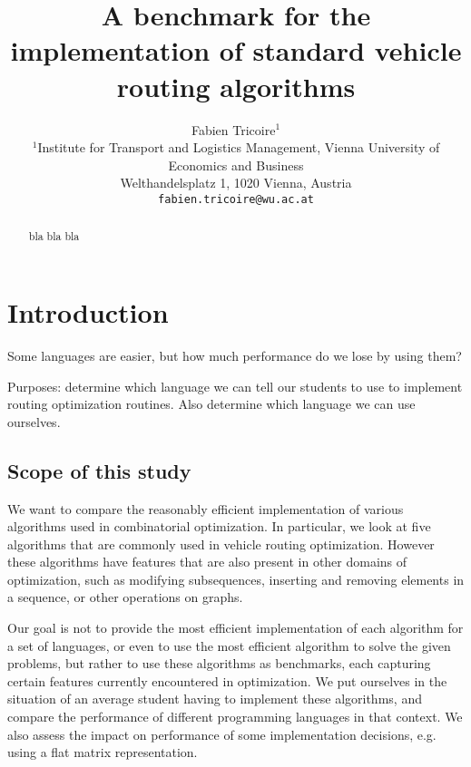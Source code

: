 \documentclass[11pt,a4paper,notitlepage]{article}
\begin{document}
\title{A benchmark for the implementation of standard vehicle routing
  algorithms}
\author{
Fabien Tricoire$^{1}$ \\[1ex]
 \small $^1$Institute for Transport and Logistics Management,
 Vienna University of Economics and Business\\
 \small Welthandelsplatz 1, 1020 Vienna, Austria\\
  \small \texttt{fabien.tricoire@wu.ac.at}\\[2ex]
}
\date{}
\maketitle

\begin{abstract}
  bla bla bla
\end{abstract}

\section{Introduction}
\label{sec:intro}

Some languages are easier, but how much performance do we lose by
using them?

Purposes: determine which language we can tell our students to
use to implement routing optimization routines. Also determine which
language we can use ourselves.

\subsection{Scope of this study}
We want to compare the reasonably efficient implementation of various
algorithms used in combinatorial optimization. In particular, we look
at five algorithms that are commonly used in vehicle routing
optimization. However these algorithms have features that are also
present in other domains of optimization, such as modifying
subsequences, inserting and removing elements in a sequence, or other
operations on graphs.

Our goal is not to provide the most efficient implementation of each
algorithm for a set of languages, or even to use the most efficient
algorithm to solve the given problems, but rather to use these
algorithms as benchmarks, each capturing certain features currently
encountered in optimization. We put ourselves in the situation of an
average student having to implement these algorithms, and compare the
performance of different programming languages in that context. We
also assess the impact on performance of some implementation
decisions, e.g. using a flat matrix representation.
\end{document}
